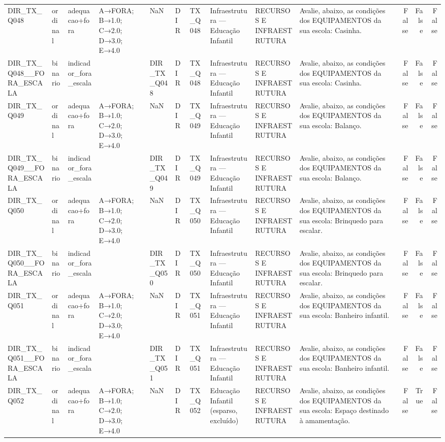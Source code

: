 \begin{tabular}{llllllllllrrr}
DIR\_TX\_Q048 & ordinal & adequacao+fora & A→FORA; B→1.0; C→2.0; D→3.0; E→4.0 & NaN & DIR & TX\_Q048 & Infraestrutura — Educação Infantil & RECURSOS E INFRAESTRUTURA & Avalie, abaixo, as condições dos EQUIPAMENTOS da sua escola: Casinha. & False & False & False \\
DIR\_TX\_Q048\_\_FORA\_ESCALA & binario & indicador\_fora\_escala &  & DIR\_TX\_Q048 & DIR & TX\_Q048 & Infraestrutura — Educação Infantil & RECURSOS E INFRAESTRUTURA & Avalie, abaixo, as condições dos EQUIPAMENTOS da sua escola: Casinha. & False & False & False \\
DIR\_TX\_Q049 & ordinal & adequacao+fora & A→FORA; B→1.0; C→2.0; D→3.0; E→4.0 & NaN & DIR & TX\_Q049 & Infraestrutura — Educação Infantil & RECURSOS E INFRAESTRUTURA & Avalie, abaixo, as condições dos EQUIPAMENTOS da sua escola: Balanço. & False & False & False \\
DIR\_TX\_Q049\_\_FORA\_ESCALA & binario & indicador\_fora\_escala &  & DIR\_TX\_Q049 & DIR & TX\_Q049 & Infraestrutura — Educação Infantil & RECURSOS E INFRAESTRUTURA & Avalie, abaixo, as condições dos EQUIPAMENTOS da sua escola: Balanço. & False & False & False \\
DIR\_TX\_Q050 & ordinal & adequacao+fora & A→FORA; B→1.0; C→2.0; D→3.0; E→4.0 & NaN & DIR & TX\_Q050 & Infraestrutura — Educação Infantil & RECURSOS E INFRAESTRUTURA & Avalie, abaixo, as condições dos EQUIPAMENTOS da sua escola:  Brinquedo para escalar. & False & False & False \\
DIR\_TX\_Q050\_\_FORA\_ESCALA & binario & indicador\_fora\_escala &  & DIR\_TX\_Q050 & DIR & TX\_Q050 & Infraestrutura — Educação Infantil & RECURSOS E INFRAESTRUTURA & Avalie, abaixo, as condições dos EQUIPAMENTOS da sua escola:  Brinquedo para escalar. & False & False & False \\
DIR\_TX\_Q051 & ordinal & adequacao+fora & A→FORA; B→1.0; C→2.0; D→3.0; E→4.0 & NaN & DIR & TX\_Q051 & Infraestrutura — Educação Infantil & RECURSOS E INFRAESTRUTURA & Avalie, abaixo, as condições dos EQUIPAMENTOS da sua escola: Banheiro infantil. & False & False & False \\
DIR\_TX\_Q051\_\_FORA\_ESCALA & binario & indicador\_fora\_escala &  & DIR\_TX\_Q051 & DIR & TX\_Q051 & Infraestrutura — Educação Infantil & RECURSOS E INFRAESTRUTURA & Avalie, abaixo, as condições dos EQUIPAMENTOS da sua escola: Banheiro infantil. & False & False & False \\
DIR\_TX\_Q052 & ordinal & adequacao+fora & A→FORA; B→1.0; C→2.0; D→3.0; E→4.0 & NaN & DIR & TX\_Q052 & Educação Infantil (esparso, excluído) & RECURSOS E INFRAESTRUTURA & Avalie, abaixo, as condições dos EQUIPAMENTOS da sua escola: Espaço destinado à amamentação. & False & True & False \\

\end{tabular}
